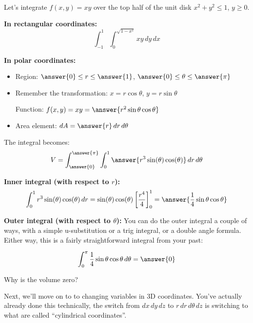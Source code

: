 \documentclass{ximera}
\begin{document}
\begin{problem}
Let's integrate $f(x,y) = xy$ over the top half of the unit disk $x^2 + y^2 \leq 1$, $y \geq 0$.

\textbf{In rectangular coordinates:}
$$\int_{-1}^1\int_{0}^{\sqrt{1-x^2}} xy\,dy\,dx$$

\textbf{In polar coordinates:}
\begin{itemize}
    \item Region: $\answer{0} \leq r \leq \answer{1}$, $\answer{0} \leq \theta \leq \answer{\pi}$
    \item Remember the transformation: $x = r\cos\theta$, $y = r\sin\theta$
    
    Function: $f(x,y) = xy = \answer{r^2 \sin\theta \cos\theta}$
    \item Area element: $dA = \answer{r}\,dr\,d\theta$
\end{itemize}

The integral becomes:
$$V = \int_{\answer{0}}^{\answer{\pi}}\int_0^1 \answer{r^3\sin(\theta)\cos(\theta)}\,dr\,d\theta$$

\textbf{Inner integral (with respect to $r$):}
$$\int_0^1 r^3\sin(\theta)\cos(\theta)\,dr = \sin(\theta)\cos(\theta)\left[\frac{r^4}{4}\right]_0^1 = \answer{\frac{1}{4}\sin\theta\cos\theta}$$

\textbf{Outer integral (with respect to $\theta$):}
You can do the outer integral a couple of ways, with a simple u-substitution or a trig integral, or a double angle formula. Either way, this is a fairly straightforward integral from your past:

$$\int_0^{\pi} \frac{1}{4}\sin\theta\cos\theta\,d\theta  = \answer{0}$$

Why is the volume zero?
\begin{multipleChoice}
\end{multipleChoice}
\end{problem}

Next, we'll move on to to changing variables in 3D coordinates. You've actually already done this technically, the switch from $dx\,dy\,dz$ to $r\,dr\,d\theta\,dz$ is switching to what are called ``cylindrical coordinates''.



\end{document}

